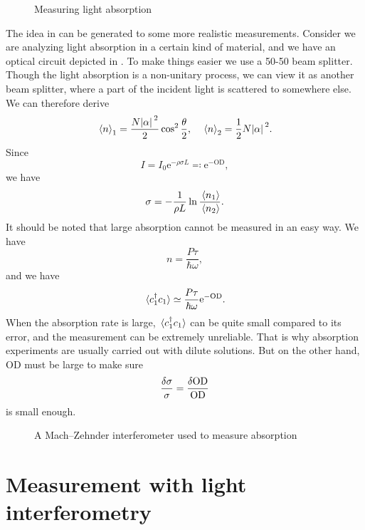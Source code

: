 \documentclass[hyperref, a4paper]{article}
\newcommand*{\ee}{\mathrm{e}}
\begin{document}
\begin{figure}
    \centering
    
    \caption{Measuring light absorption}
    \label{fig:absorption-measure}
\end{figure}

The idea in  can be generated to some more realistic measurements.
Consider we are analyzing light absorption in a certain kind of material, and we have an optical circuit depicted in .
To make things easier we use a 50-50 beam splitter.
Though the light absorption is a non-unitary process, we can view it as another beam splitter, where a part of the incident light is scattered to somewhere else.
We can therefore derive 
\begin{equation}
    \expval*{n}_1 = \frac{N \abs*{\alpha}^2}{2} \cos^2 \frac{\theta}{2}, \quad \expval*{n}_2 = \frac{1}{2} N \abs*{\alpha}^2.
\end{equation}
Since 
\begin{equation}
    I = I_0 \ee^{- \rho \sigma L} \eqqcolon \ee^{- \mathrm{OD}},
\end{equation}
we have 
\begin{equation}
    \sigma = - \frac{1}{\rho L} \ln \frac{\expval*{n_1}}{\expval*{n_2}}.
\end{equation}
It should be noted that large absorption cannot be measured in an easy way.
We have 
\[
    n = \frac{P \tau}{\hbar \omega},
\]
and we have 
\begin{equation}
    \expval*{c^\dagger_1 c_1} \simeq \frac{P \tau}{\hbar \omega} \ee^{- \text{OD}}.
\end{equation}
When the absorption rate is large, $\expval*{c_1^\dagger c_1}$ can be quite small compared to its error, and the measurement can be extremely unreliable.
That is why absorption experiments are usually carried out with dilute solutions.
But on the other hand, $\text{OD}$ must be large to make sure 
\begin{equation}
    \frac{\var{\sigma}}{\sigma} = \frac{\var{\text{OD}}}{\text{OD}}
\end{equation}
is small enough.

\begin{figure}
    \centering
    
    \caption{A Mach–Zehnder interferometer used to measure absorption}
    \label{fig:mach-zehnder}
\end{figure}

\section{Measurement with light interferometry}
\end{document}
